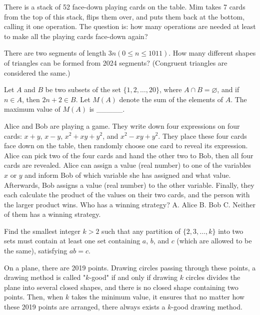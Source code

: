 \begin{problem}\label{Combinary-10}
 There is a stack of 52 face-down playing cards on the table. Mim takes 7 cards from the top of this stack, flips them over, and puts them back at the bottom, calling it one operation. The question is: how many operations are needed at least to make all the playing cards face-down again?
\end{problem}


\begin{problem}\label{Combinary-11}
There are two segments of length $3n (0 \leq n \leq 1011)$. How many different shapes of triangles can be formed from 2024 segments? (Congruent triangles are considered the same.)
\end{problem}

\begin{problem}\label{Combinary-12}
Let $A$ and $B$ be two subsets of the set $\{1,2, \ldots, 20\}$, where $A \cap B = \varnothing$, and if $n \in A$, then $2n + 2 \in B$. Let $M(A)$ denote the sum of the elements of $A$. The maximum value of $M(A)$ is \_\_\_\_\_. 
\end{problem}


\begin{problem}\label{Combinary-13}
Alice and Bob are playing a game. They write down four expressions on four cards: $x+y$, $x-y$, $x^2+xy+y^2$, and $x^2-xy+y^2$. They place these four cards face down on the table, then randomly choose one card to reveal its expression. Alice can pick two of the four cards and hand the other two to Bob, then all four cards are revealed. Alice can assign a value (real number) to one of the variables $x$ or $y$ and inform Bob of which variable she has assigned and what value. Afterwards, Bob assigns a value (real number) to the other variable. Finally, they each calculate the product of the values on their two cards, and the person with the larger product wins. Who has a winning strategy?
A. Alice
B. Bob
C. Neither of them has a winning strategy.
\end{problem}


\begin{problem}\label{Combinary-14}
 Find the smallest integer $k > 2$ such that any partition of $\{2,3,\ldots,k\}$ into two sets must contain at least one set containing $a$, $b$, and $c$ (which are allowed to be the same), satisfying $ab=c$.
\end{problem}


\begin{problem}\label{Combinary-15}
 On a plane, there are 2019 points. Drawing circles passing through these points, a drawing method is called "$k$-good" if and only if drawing $k$ circles divides the plane into several closed shapes, and there is no closed shape containing two points. Then, when $k$ takes the minimum value, it ensures that no matter how these 2019 points are arranged, there always exists a $k$-good drawing method.
\end{problem}


